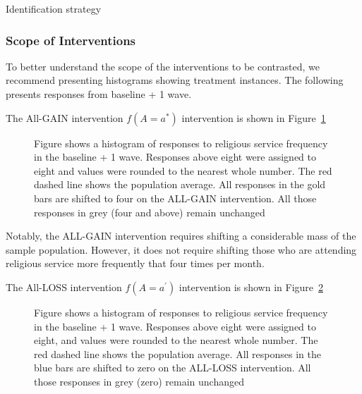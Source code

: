 \documentclass[
  single column]{article}
\begin{document}
\begin{table}

\caption{\label{tbl-identification}Identification strategy}


\end{table}%

\subsubsection{Scope of Interventions}\label{scope-of-interventions}

To better understand the scope of the interventions to be contrasted, we
recommend presenting histograms showing treatment instances. The
following presents responses from baseline + 1 wave.

The All-GAIN intervention \(f(A=a^*)\) intervention is shown in
Figure~\ref{fig-0up}

\begin{figure}


\caption{\label{fig-0up}Figure shows a histogram of responses to
religious service frequency in the baseline + 1 wave. Responses above
eight were assigned to eight and values were rounded to the nearest
whole number. The red dashed line shows the population average. All
responses in the gold bars are shifted to four on the ALL-GAIN
intervention. All those responses in grey (four and above) remain
unchanged}

\end{figure}%

Notably, the ALL-GAIN intervention requires shifting a considerable mass
of the sample population. However, it does not require shifting those
who are attending religious service more frequently that four times per
month.

The All-LOSS intervention \(f(A=a^\prime)\) intervention is shown in
Figure~\ref{fig-0down}

\begin{figure}


\caption{\label{fig-0down}Figure shows a histogram of responses to
religious service frequency in the baseline + 1 wave. Responses above
eight were assigned to eight, and values were rounded to the nearest
whole number. The red dashed line shows the population average. All
responses in the blue bars are shifted to zero on the ALL-LOSS
intervention. All those responses in grey (zero) remain unchanged}

\end{figure}%
\end{document}
